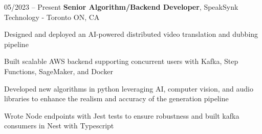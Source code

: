 \begin{twocolentry}{
    05/2023 – Present
}
\fontsize{11 pt}{11 pt}\textbf{Senior Algorithm/Backend Developer}, SpeakSynk Technology - Toronto ON, CA\end{twocolentry}

\vspace{0.10 cm}
\begin{onecolentry}
    \begin{highlights}
        \item Designed and deployed an AI-powered distributed video translation and dubbing pipeline
        \item Built scalable AWS backend supporting concurrent users with Kafka, Step Functions, SageMaker, and Docker
        \item Developed new algorithms in python leveraging AI, computer vision, and audio libraries to enhance the realism and accuracy of the generation pipeline 
        \item Wrote Node endpoints with Jest tests to ensure robustness and built kafka consumers in Nest with Typescript
    \end{highlights}
\end{onecolentry}
